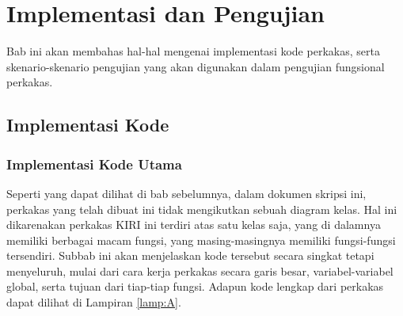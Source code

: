 \chapter{Implementasi dan Pengujian}
\label{chap:testing}

Bab ini akan membahas hal-hal mengenai implementasi kode perkakas, serta skenario-skenario pengujian yang akan digunakan dalam pengujian fungsional perkakas.

\section{Implementasi Kode}
\label{sec:testing-implementation}

\subsection{Implementasi Kode Utama}
\label{sec:testing-implementation-main}

Seperti yang dapat dilihat di bab sebelumnya, dalam dokumen skripsi ini, perkakas yang telah dibuat ini tidak mengikutkan sebuah diagram kelas. Hal ini dikarenakan perkakas \cl KIRI ini terdiri atas satu kelas saja, yang di dalamnya memiliki berbagai macam fungsi, yang masing-masingnya memiliki fungsi-fungsi tersendiri. Subbab ini akan menjelaskan kode tersebut secara singkat tetapi menyeluruh, mulai dari cara kerja perkakas secara garis besar, variabel-variabel global, serta tujuan dari tiap-tiap fungsi. Adapun kode lengkap dari perkakas dapat dilihat di Lampiran \ref{lamp:A}.
	
